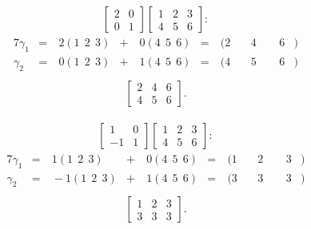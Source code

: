 \documentclass[12pt]{article}
\begin{document}
\begin{exm}
  \begin{align*}
    \begin{bmatrix}
      2 & 0\\
      0 & 1
    \end{bmatrix}
    \begin{bmatrix}
      1 & 2 & 3\\
      4 & 5 & 6
    \end{bmatrix}:
  \end{align*}
  \begin{alignat*}{7}
    \gamma_1 &=&\ 2(1\ \ 2\ \ 3) &+&\ 0(4\ \ 5\ \ 6)
      &=&\ (2&\ &4&\ \ &6&)\\
    \gamma_2 &=&\ 0(1\ \ 2\ \ 3) &+&\ 1(4\ \ 5\ \ 6)
      &=&\ (4&\ &5&\ \ &6&)\\
  \end{alignat*}
  \begin{align*}
    \begin{bmatrix}
      2 & 4 & 6\\
      4 & 5 & 6
    \end{bmatrix}.
  \end{align*}
\end{exm}

\begin{exm}
  \begin{align*}
    \begin{bmatrix}
      1 & 0\\
      -1 & 1
    \end{bmatrix}
    \begin{bmatrix}
      1 & 2 & 3\\
      4 & 5 & 6
    \end{bmatrix}:
  \end{align*}
  \begin{alignat*}{7}
    \gamma_1 &=&\ 1(1\ \ 2\ \ 3) &+&\ 0(4\ \ 5\ \ 6)
      &=&\ (1&\ &2&\ \ &3&)\\
    \gamma_2 &=&\ -1(1\ \ 2\ \ 3) &+&\ 1(4\ \ 5\ \ 6)
      &=&\ (3&\ &3&\ \ &3&)\\
  \end{alignat*}
  \begin{align*}
    \begin{bmatrix}
      1 & 2 & 3\\
      3 & 3 & 3
    \end{bmatrix}.
  \end{align*}
\end{exm}
\end{document}
